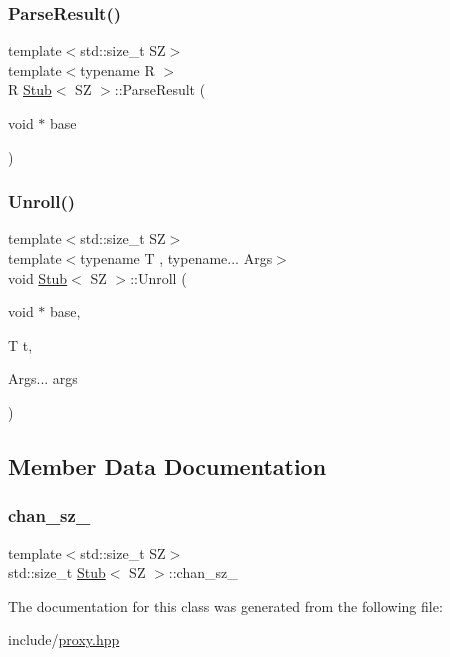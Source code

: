 \mbox{\label{classStub_a3eb7ab0bf78f5a7bb7668bc70e9dfc88}} 
\subsubsection{\texorpdfstring{Parse\+Result()}{ParseResult()}}
{\footnotesize\ttfamily template$<$std\+::size\+\_\+t SZ$>$ \\
template$<$typename R $>$ \\
R \hyperlink{classStub}{Stub}$<$ SZ $>$\+::Parse\+Result (\begin{DoxyParamCaption}\item[{void $\ast$}]{base }\end{DoxyParamCaption})\hspace{0.3cm}{\ttfamily [inline]}}

\mbox{\label{classStub_aeaed7e40c227acf10dd0b82a8a5d0306}} 
\subsubsection{\texorpdfstring{Unroll()}{Unroll()}}
{\footnotesize\ttfamily template$<$std\+::size\+\_\+t SZ$>$ \\
template$<$typename T , typename... Args$>$ \\
void \hyperlink{classStub}{Stub}$<$ SZ $>$\+::Unroll (\begin{DoxyParamCaption}\item[{void $\ast$}]{base,  }\item[{T}]{t,  }\item[{Args...}]{args }\end{DoxyParamCaption})\hspace{0.3cm}{\ttfamily [inline]}}



\subsection{Member Data Documentation}
\mbox{\label{classStub_a758cf7539d362589c476e72ed8cb01cf}} 
\subsubsection{\texorpdfstring{chan\+\_\+sz\+\_\+}{chan\_sz\_}}
{\footnotesize\ttfamily template$<$std\+::size\+\_\+t SZ$>$ \\
std\+::size\+\_\+t \hyperlink{classStub}{Stub}$<$ SZ $>$\+::chan\+\_\+sz\+\_\+\hspace{0.3cm}{\ttfamily [private]}}



The documentation for this class was generated from the following file\+:\begin{DoxyCompactItemize}
\item 
include/\hyperlink{proxy_8hpp}{proxy.\+hpp}\end{DoxyCompactItemize}
